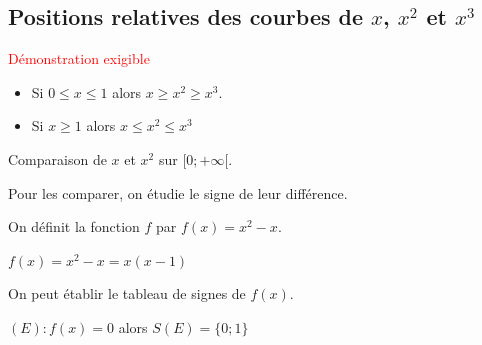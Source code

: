 \begin{pageCours}
\begin{minipage}{0.48\linewidth}
\end{minipage}

\section{{Positions relatives des courbes de $x$, $x^2$ et $x^3$}}

\begin{Pp}
\textcolor{red}{Démonstration exigible}

\begin{itemize}
\item Si $0\leq x \leq 1$ alors $x\geq x^2 \geq x^3$.
\item Si $x\geq 1$ alors $x\leq x^2 \leq x^3$
\end{itemize}

\end{Pp}


\vspace{.2cm}


\begin{Pv}
Comparaison de $x$ et $x^2$ sur $[0;+\infty[$.

Pour les comparer, on étudie le signe de leur différence.

On définit la fonction $f$ par $f(x)=x^2-x$.

$f(x)=x^2-x=x(x-1)$

On peut établir le tableau de signes de $f(x)$.

$(E):f(x)=0$ alors $S(E)=\{0;1\}$\vspace{.2cm}



\end{Pv}
\end{pageCours}
